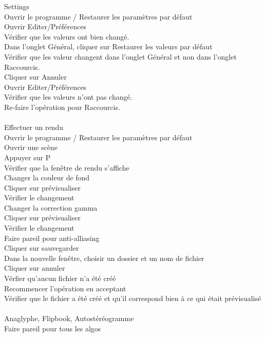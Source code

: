 
Settings\\
		Ouvrir le programme / Restaurer les paramètres par défaut\\
		Ouvrir Editer/Préférences\\
		Vérifier que les valeurs ont bien changé.\\
		Dans l'onglet Général, cliquer sur Restaurer les valeurs par défaut\\
		Vérifier que les valeur changent dans l'onglet Général et non dans l'onglet Raccourcis.\\
		Cliquer sur Annuler\\
		Ouvrir Editer/Préférences\\
		Vérifier que les valeurs n'ont pas changé.\\
		Re-faire l'opération pour Raccourcis.\\
\\

Effectuer un rendu\\
		Ouvrir le programme / Restaurer les paramètres par défaut\\
		Ouvrir une scène \\
		Appuyer sur P\\
		Vérifier que la fenêtre de rendu s'affiche\\
		Changer la couleur de fond\\
		Cliquer sur prévisualiser \\
		Vérifier le changement\\
		Changer la correction gamma\\
		Cliquer sur prévisualiser \\
		Vérifier le changement\\
		Faire pareil pour anti-alliasing\\
		Cliquer sur sauvegarder\\
		Dans la nouvelle fenêtre, choisir un dossier et un nom de fichier\\
		Cliquer sur annuler\\
		Vérfier qu'aucun fichier n'a été créé\\
		Recommencer l'opération en acceptant\\
		Vérifier que le fichier a été créé et qu'il correspond bien à ce qui était prévisualisé\\
\\

Anaglyphe, Flipbook, Autostéréogramme\\
		Faire pareil pour tous les algos\\
\\

